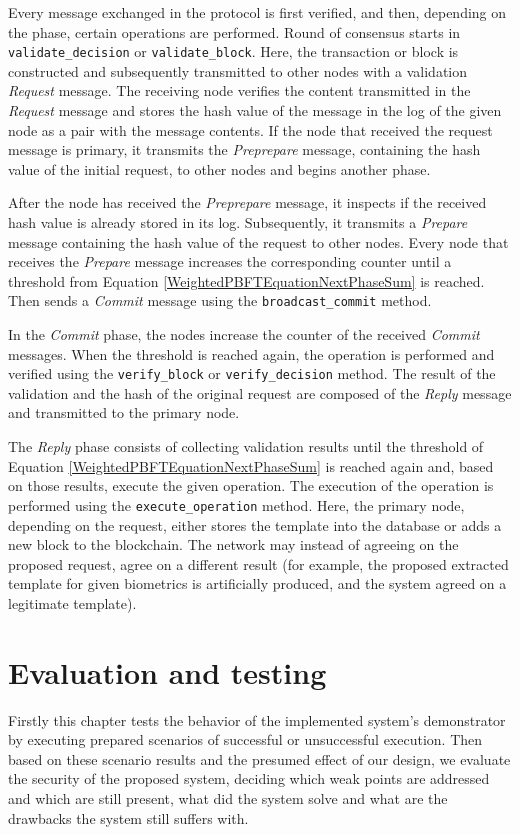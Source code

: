 Every message exchanged in the protocol is first verified, and then, depending on the phase, certain operations are performed. Round of consensus starts in \texttt{validate\_decision} or \texttt{validate\_block}. Here, the transaction or block is constructed and subsequently transmitted to other nodes with a validation \emph{Request} message.
The receiving node verifies the content transmitted in the \emph{Request} message and stores the hash value of the message in the log of the given node as a pair with the message contents. If the node that received the request message is primary, it transmits the \emph{Preprepare} message, containing the hash value of the initial request, to other nodes and begins another phase.

After the node has received the \emph{Preprepare} message, it inspects if the received hash value is already stored in its log. Subsequently, it transmits a \emph{Prepare} message containing the hash value of the request to other nodes. Every node that receives the \emph{Prepare} message increases the corresponding counter until a threshold from Equation \ref{WeightedPBFTEquationNextPhaseSum} is reached. Then sends a \emph{Commit} message using the \texttt{broadcast\_commit} method.

In the \emph{Commit} phase, the nodes increase the counter of the received \emph{Commit} messages. When the threshold is reached again, the operation is performed and verified using the \texttt{verify\_block} or \texttt{verify\_decision} method.  The result of the validation and the hash of the original request are composed of the \emph{Reply} message and transmitted to the primary node.

The \emph{Reply} phase consists of collecting validation results until the threshold of Equation \ref{WeightedPBFTEquationNextPhaseSum} is reached again and, based on those results, execute the given operation. The execution of the operation is performed using the \texttt{execute\_operation} method. Here, the primary node, depending on the request, either stores the template into the database or adds a new block to the blockchain. The network may instead of agreeing on the proposed request, agree on a different result (for example, the proposed extracted template for given biometrics is artificially produced, and the system agreed on a legitimate template).


\chapter{Evaluation and testing}
 Firstly this chapter tests the behavior of the implemented system's demonstrator by executing prepared scenarios of successful or unsuccessful execution. Then based on these scenario results and the presumed effect of our design, we evaluate the security of the proposed system, deciding which weak points are addressed and which are still present, what did the system solve and what are the drawbacks the system still suffers with. 

